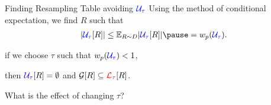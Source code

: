 \documentclass{beamer}
\def\padding{\vspace{0.5cm}}
\begin{document}
\begin{frame}{Finding Resampling Table avoiding $\textcolor{blue}{\mathcal{U}_\tau}$}
Using the method of conditional expectation, we find $R$ such that \vspace{-0.5em}\begin{align*}
    |\compat{\U}{R}| \leq \E[R \sim \distr]{|\compat{\U}{R}|} \pause = \w(\U).
\end{align*}\pause

\vspace{-1.8em}\follows if we choose $\tau$ such that $w_p(\textcolor{blue}{\mathcal{U}_\tau}) < 1$,\par then $\textcolor{blue}{\mathcal{U}_\tau}[R] = \emptyset$ and $\mathcal{G}[R] \subseteq \textcolor{red}{\mathcal{L}_\tau}[R]$.\pause\padding

What is the effect of changing $\tau$?\pause\vspace{0.1em}

\centering
\end{frame}
\end{document}
